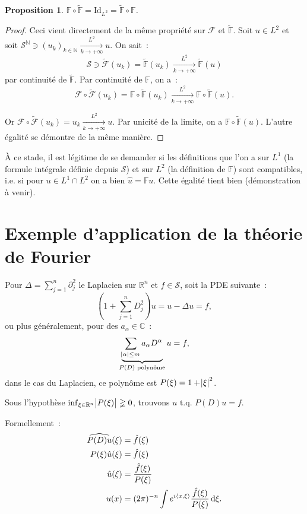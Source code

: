 \documentclass{report}
\newcommand{\C}{{\mathbb C}}
\newcommand{\R}{{\mathbb R}}
\newcommand{\N}{{\mathbb N}}
\newcommand{\scpr}[2]{\left\langle#1, #2\right\rangle}
\newcommand{\tq}{\text{ t.q. }}
\newcommand{\pinfty}{{+\infty}}
\newcommand{\Id}{\mathrm {Id}}
\newtheorem{prp}[thm]{Proposition}
\theoremstyle{definition}
\theoremstyle{remark}
\begin{document}
\begin{prp} $\mathbb F \circ \tilde {\mathbb F} = \Id_{L^2} = \tilde {\mathbb F} \circ \mathbb F$.
\end{prp}

\begin{proof} Ceci vient directement de la même propriété sur $\mathcal F$ et $\tilde {\mathbb F}$. Soit $u \in L^2$ et soit
$\mathcal S^\N \ni (u_k)_{k \in \N} \xrightarrow[k \to \pinfty]{L^2} u$. On sait~:
\[\mathcal S \ni \tilde {\mathcal F}(u_k) = \tilde {\mathbb F}(u_k) \xrightarrow[k \to \pinfty]{L^2} \tilde {\mathbb F}(u)\]
par continuité de $\tilde {\mathbb F}$. Par continuité de $\mathbb F$, on a~:
\[\mathcal F \circ \tilde {\mathcal F}(u_k) = \mathbb F \circ \tilde {\mathbb F}(u_k) \xrightarrow[k \to \pinfty]{L^2} \mathbb F \circ \tilde {\mathbb F}(u).\]

Or $\mathcal F \circ \tilde {\mathcal F}(u_k) = u_k \xrightarrow[k \to \pinfty]{L^2} u$. Par unicité de la limite, on a $\mathbb F \circ \tilde {\mathbb F}(u)$.
L'autre égalité se démontre de la même manière.
\end{proof}

À ce stade, il est légitime de se demander si les définitions que l'on a sur $L^1$ (la formule intégrale définie depuis $\mathcal S$) et sur $L^2$ (la définition de $\mathbb F$)
sont compatibles, i.e. si pour $u \in L^1 \cap L^2$ on a bien $\hat u = \mathbb Fu$. Cette égalité tient bien (démonstration à venir).

\section{Exemple d'application de la théorie de Fourier}

Pour $\Delta = \sum_{j=1}^n\partial_j^2$ le Laplacien sur $\R^n$ et $f \in \mathcal S$, soit la PDE suivante~:
\begin{equation}
	(1+\sum_{j=1}^nD_j^2)u = u-\Delta u = f,
\end{equation}
ou plus généralement, pour des $a_\alpha \in \C$~:
\begin{equation}\label{eq:PDE générale Fourier}
	\underbrace {\sum_{\abs \alpha \leq m}a_\alpha D^\alpha}_{P(D) \text{ polynôme}} u = f,
\end{equation}
dans le cas du Laplacien, ce polynôme est $P(\xi) = 1+\abs \xi^2$.

Sous l'hypothèse $\inf_{\xi \in \R^n}\abs {P(\xi)} \gneqq 0$, trouvons $u \tq P(D)u = f$.

Formellement~:
\begin{align*}
	\widehat {P(D)u}(\xi) &= \hat f(\xi) \\
	P(\xi)\hat u(\xi) &= \hat f(\xi) \\
	\hat u(\xi) &= \frac {\hat f(\xi)}{P(\xi)} \\
	u(x) &= (2\pi)^{-n}\int e^{i\scpr x\xi}\frac {\hat f(\xi)}{P(\xi)}\dif\xi.
\end{align*}
\end{document}
